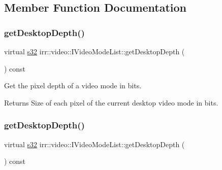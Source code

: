 \subsection{Member Function Documentation}
\mbox{\label{classirr_1_1video_1_1IVideoModeList_a15869ac6919f6f29d2a25fcf13b6dd45}} 
\subsubsection{\texorpdfstring{get\+Desktop\+Depth()}{getDesktopDepth()}\hspace{0.1cm}{\footnotesize\ttfamily [1/2]}}
{\footnotesize\ttfamily virtual \hyperlink{namespaceirr_ac66849b7a6ed16e30ebede579f9b47c6}{s32} irr\+::video\+::\+I\+Video\+Mode\+List\+::get\+Desktop\+Depth (\begin{DoxyParamCaption}{ }\end{DoxyParamCaption}) const\hspace{0.3cm}{\ttfamily [pure virtual]}}



Get the pixel depth of a video mode in bits. 

\begin{DoxyReturn}{Returns}
Size of each pixel of the current desktop video mode in bits. 
\end{DoxyReturn}
\mbox{\label{classirr_1_1video_1_1IVideoModeList_a15869ac6919f6f29d2a25fcf13b6dd45}} 
\subsubsection{\texorpdfstring{get\+Desktop\+Depth()}{getDesktopDepth()}\hspace{0.1cm}{\footnotesize\ttfamily [2/2]}}
{\footnotesize\ttfamily virtual \hyperlink{namespaceirr_ac66849b7a6ed16e30ebede579f9b47c6}{s32} irr\+::video\+::\+I\+Video\+Mode\+List\+::get\+Desktop\+Depth (\begin{DoxyParamCaption}{ }\end{DoxyParamCaption}) const\hspace{0.3cm}{\ttfamily [pure virtual]}}



